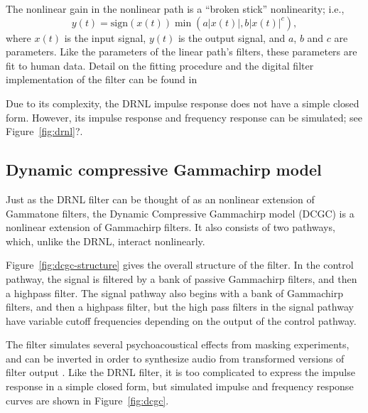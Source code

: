 
The nonlinear gain in the nonlinear path
is a ``broken stick'' nonlinearity;
i.e.,
\begin{equation}
  y(t) = \text{sign}(x(t)) \min(a |x(t)|, b |x(t)|^c),
\end{equation}
where $x(t)$ is the input signal,
$y(t)$ is the output signal,
and $a$, $b$ and $c$ are parameters.
Like the parameters of the linear path's filters,
these parameters are fit to human data.
Detail on the fitting procedure
and the digital filter implementation
of the filter can be found in \cite{lopez2001}


Due to its complexity,
the DRNL impulse response does not have a simple closed form.
However, its impulse response
and frequency response can be simulated;
see Figure~\ref{fig:drnl}?.

\subsection{Dynamic compressive Gammachirp model}

Just as the DRNL filter can be thought of
as an nonlinear extension of Gammatone filters,
the Dynamic Compressive Gammachirp model (DCGC)
\cite{irino2006}
is a nonlinear extension of Gammachirp filters.
It also consists of two pathways,
which, unlike the DRNL,
interact nonlinearly.


Figure~\ref{fig:dcgc-structure}
gives the overall structure of the filter.
In the control pathway,
the signal is filtered by
a bank of passive Gammachirp filters,
and then a highpass filter.
The signal pathway
also begins with a bank of Gammachirp filters,
and then a highpass filter,
but the high pass filters in the signal pathway
have variable cutoff frequencies
depending on the output of the control pathway.

The filter simulates
several psychoacoustical effects
from masking experiments,
and can be inverted in order to
synthesize audio
from transformed versions
of filter output
\cite{irino2006}.
Like the DRNL filter, it is too complicated
to express the impulse response
in a simple closed form,
but simulated impulse and frequency response
curves are shown in Figure~\ref{fig:dcgc}.


